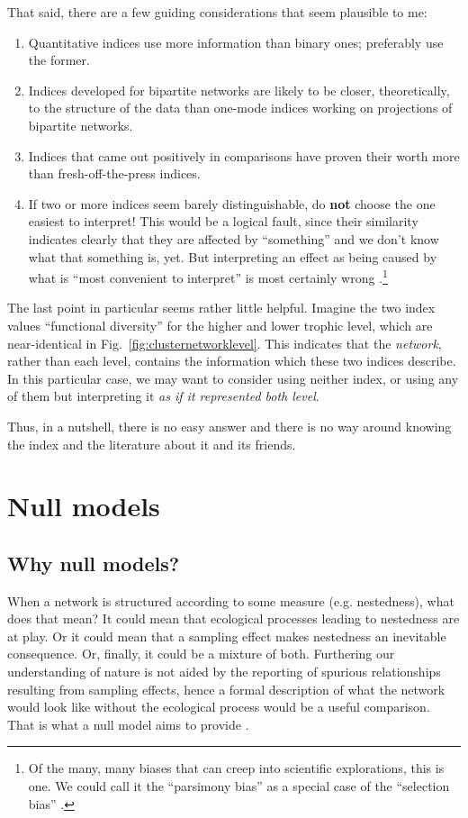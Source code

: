 \documentclass[a4paper, 11pt]{article}\usepackage[]{graphicx}\usepackage[]{color}
\begin{document}
That said, there are a few guiding considerations that seem plausible to me:
\begin{enumerate}
\item Quantitative indices use more information than binary ones; preferably use the former.
\item Indices developed for bipartite networks are likely to be closer, theoretically, to the structure of the data than one-mode indices working on projections of bipartite networks.
\item Indices that came out positively in comparisons have proven their worth more than fresh-off-the-press indices.
\item If two or more indices seem barely distinguishable, do \textbf{not} choose the one easiest to interpret! This would be a logical fault, since their similarity indicates clearly that they are affected by ``something'' and we don't know what that something is, yet. But interpreting an effect as being caused by what is ``most convenient to interpret'' is most certainly wrong \citep{Shermer2012}.\footnote{Of the many, many biases that can creep into scientific explorations, this is one. We could call it the ``parsimony bias'' as a special case of the ``selection bias'' \citep{Shermer2012}.}
\end{enumerate}
%
The last point in particular seems rather little helpful. Imagine the two index values ``functional diversity'' for the higher and lower trophic level, which are near-identical in Fig.~\ref{fig:clusternetworklevel}. This indicates that the \emph{network}, rather than each level, contains the information which these two indices describe. In this particular case, we may want to consider using neither index, or using any of them but interpreting it \emph{as if it represented \emph{both} level}.

Thus, in a nutshell, there is no easy answer and there is no way around knowing the index and the literature about it and its friends.





\section{Null models} %
  \label{sec:nullmodels}

\subsection{Why null models?}
When a network is structured according to some measure (e.g. nestedness), what does that mean? It could mean that ecological processes leading to nestedness are at play. Or it could mean that a sampling effect makes nestedness an inevitable consequence. Or, finally, it could be a mixture of both. Furthering our understanding of nature is not aided by the reporting of spurious relationships resulting from sampling effects, hence a formal description of what the network would look like without the ecological process would be a useful comparison. That is what a null model aims to provide \citep{Gotelli1996}. 
\end{document}
